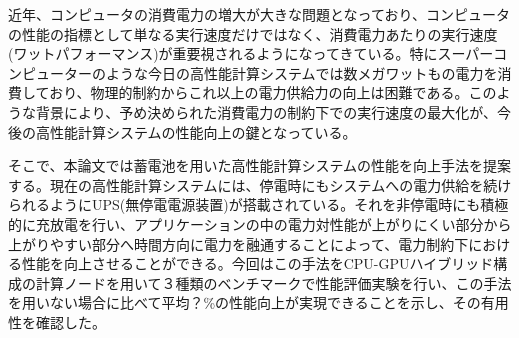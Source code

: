 近年、コンピュータの消費電力の増大が大きな問題となっており、コンピュータの性能の指標として単なる実行速度だけではなく、消費電力あたりの実行速度(ワットパフォーマンス)が重要視されるようになってきている。特にスーパーコンピューターのような今日の高性能計算システムでは数メガワットもの電力を消費しており、物理的制約からこれ以上の電力供給力の向上は困難である。このような背景により、予め決められた消費電力の制約下での実行速度の最大化が、今後の高性能計算システムの性能向上の鍵となっている。

そこで、本論文では蓄電池を用いた高性能計算システムの性能を向上手法を提案する。現在の高性能計算システムには、停電時にもシステムへの電力供給を続けられるようにUPS(無停電電源装置)が搭載されている。それを非停電時にも積極的に充放電を行い、アプリケーションの中の電力対性能が上がりにくい部分から上がりやすい部分へ時間方向に電力を融通することによって、電力制約下における性能を向上させることができる。今回はこの手法をCPU-GPUハイブリッド構成の計算ノードを用いて３種類のベンチマークで性能評価実験を行い、この手法を用いない場合に比べて平均？\%の性能向上が実現できることを示し、その有用性を確認した。
